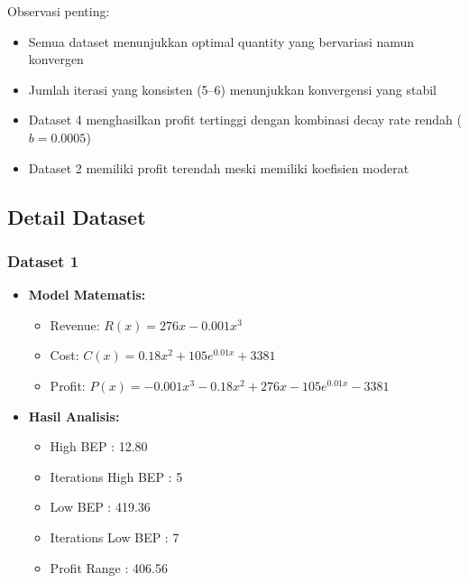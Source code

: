 \documentclass[conference]{IEEEtran}
\begin{document}
Observasi penting:
\begin{itemize}
\item Semua dataset menunjukkan optimal quantity yang bervariasi namun konvergen
\item Jumlah iterasi yang konsisten (5–6) menunjukkan konvergensi yang stabil
\item Dataset 4 menghasilkan profit tertinggi dengan kombinasi decay rate rendah ($b = 0.0005$)
\item Dataset 2 memiliki profit terendah meski memiliki koefisien moderat
\end{itemize}

\subsection{Detail Dataset}

\subsubsection{Dataset 1}
\begin{itemize}
\item \textbf{Model Matematis:}
\begin{itemize}
\item Revenue: \( R(x) = 276x - 0.001x^3 \)
\item Cost: \( C(x) = 0.18x^2 + 105e^{0.01x} + 3381 \)
\item Profit: \( P(x) = -0.001x^3 - 0.18x^2 + 276x - 105e^{0.01x} - 3381 \)
\end{itemize}
\item \textbf{Hasil Analisis:}
\begin{itemize}
\item High BEP              : 12.80
\item Iterations High BEP   : 5
\item Low BEP               : 419.36
\item Iterations Low BEP    : 7
\item Profit Range : 406.56
\end{itemize}
\end{itemize}
\end{document}
